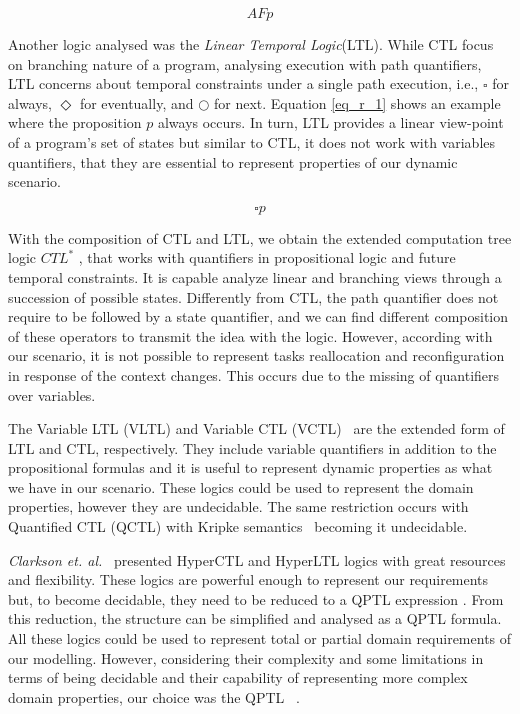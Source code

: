 \begin{equation}
\label{eq_r_2}
    AFp
\end{equation}

Another logic analysed was the \textit{Linear Temporal Logic}(LTL)\cite{LTL001}. While CTL focus on branching nature of a program, analysing execution with path quantifiers, LTL concerns about temporal constraints under a single path execution, i.e., $\square$ for always, $\Diamond$ for eventually, and $\bigcirc$ for next. Equation \ref{eq_r_1} shows an example where the proposition $p$ always occurs. In turn, LTL provides a linear view-point of a program's set of states but similar to CTL, it does not work with variables quantifiers, that they are essential to represent properties of our dynamic scenario.

\begin{equation}
\label{eq_r_1}
    \square p
\end{equation}

With the composition of CTL and LTL, we obtain the extended computation tree logic $CTL^*$ \cite{deharbe2004}, that works with quantifiers in propositional logic and future temporal constraints. It is capable analyze linear and branching views through a succession of possible states. Differently from CTL, the path quantifier does not require to be followed by a state quantifier, and we can find different composition of these operators to transmit the idea with the logic. However, according with our scenario, it is not possible to represent tasks reallocation and reconfiguration in response of the context changes. This occurs due to the missing of quantifiers over variables.

The Variable LTL (VLTL) and Variable CTL (VCTL)~\cite{SONG2016104} are the extended form of LTL and CTL, respectively. They include variable quantifiers in addition to the propositional formulas and it is useful to represent dynamic properties as what we have in our scenario. These logics could be used to represent the domain properties, however they are undecidable. The same restriction occurs with Quantified CTL (QCTL) with Kripke semantics~\cite{QCTL01} becoming it undecidable.

\textit{Clarkson et. al.}~\cite{clarkson2014} presented HyperCTL and HyperLTL logics with great resources and flexibility. These logics are powerful enough to represent our requirements but, to become decidable, they need to be reduced to a QPTL expression \cite{QPTL01}\cite{QPTL02}. From this reduction, the structure can be simplified and analysed as a QPTL formula. All these logics could be used to represent total or partial domain requirements of our modelling. However, considering their complexity and some limitations in terms of being decidable and their capability of representing more complex domain properties, our choice was the QPTL
~\cite{qptl01}. 


